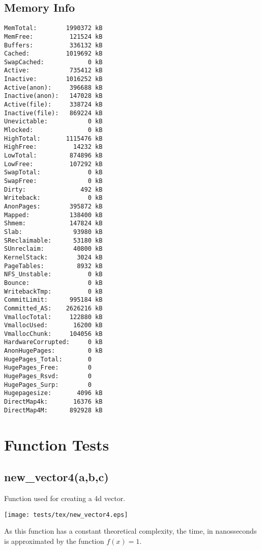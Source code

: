 \documentclass{article}
\begin{document}
\subsection{Memory Info}
\begin{verbatim}
MemTotal:        1990372 kB
MemFree:          121524 kB
Buffers:          336132 kB
Cached:          1019692 kB
SwapCached:            0 kB
Active:           735412 kB
Inactive:        1016252 kB
Active(anon):     396688 kB
Inactive(anon):   147028 kB
Active(file):     338724 kB
Inactive(file):   869224 kB
Unevictable:           0 kB
Mlocked:               0 kB
HighTotal:       1115476 kB
HighFree:          14232 kB
LowTotal:         874896 kB
LowFree:          107292 kB
SwapTotal:             0 kB
SwapFree:              0 kB
Dirty:               492 kB
Writeback:             0 kB
AnonPages:        395872 kB
Mapped:           138400 kB
Shmem:            147824 kB
Slab:              93980 kB
SReclaimable:      53180 kB
SUnreclaim:        40800 kB
KernelStack:        3024 kB
PageTables:         8932 kB
NFS_Unstable:          0 kB
Bounce:                0 kB
WritebackTmp:          0 kB
CommitLimit:      995184 kB
Committed_AS:    2626216 kB
VmallocTotal:     122880 kB
VmallocUsed:       16200 kB
VmallocChunk:     104056 kB
HardwareCorrupted:     0 kB
AnonHugePages:         0 kB
HugePages_Total:       0
HugePages_Free:        0
HugePages_Rsvd:        0
HugePages_Surp:        0
Hugepagesize:       4096 kB
DirectMap4k:       16376 kB
DirectMap4M:      892928 kB
\end{verbatim}
\section{Function Tests}
\subsection{new\_vector4(a,b,c)}
Function used for creating a 4d vector.


\texttt{[image: tests/tex/new\_vector4.eps]}

As this function has a constant theoretical
complexity, the time, in nanosseconds is 
approximated by the function $f(x)=1$.
\end{document}
